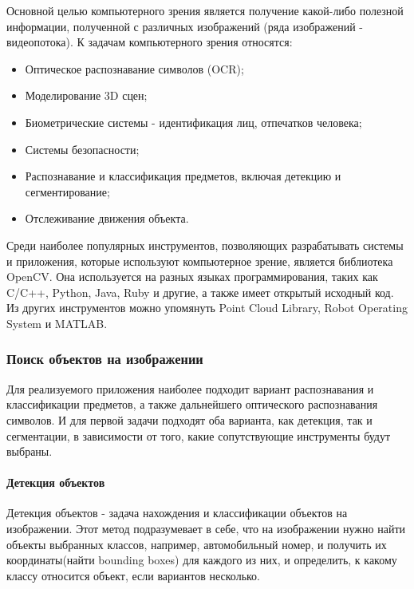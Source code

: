 \documentclass[a4paper,12pt]{article}
\begin{document}
Основной целью компьютерного зрения является получение какой-либо полезной информации, полученной с различных изображений (ряда изображений - видеопотока).
К задачам компьютерного зрения относятся:
\begin{itemize}
    \item Оптическое распознавание символов (OCR);
    \item Моделирование 3D сцен;
    \item Биометрические системы - идентификация лиц, отпечатков человека;
    \item Системы безопасности;
    \item Распознавание и классификация предметов, включая детекцию и сегментирование;
    \item Отслеживание движения объекта. \cite{goryachkin}
\end{itemize} 

Среди наиболее популярных инструментов, позволяющих разрабатывать системы и приложения, которые используют компьютерное зрение, является библиотека OpenCV. Она используется на разных языках программирования, таких как C/C++, Python, Java, Ruby и другие, а также имеет открытый исходный код.
Из других инструментов можно упомянуть Point Cloud Library, Robot Operating System и MATLAB.

\subsubsection{Поиск объектов на изображении}

Для реализуемого приложения наиболее подходит вариант распознавания и классификации предметов, а также дальнейшего оптического распознавания символов. И для первой задачи подходят оба варианта, как детекция, так и сегментации, в зависимости от того, какие сопутствующие инструменты будут выбраны.

\paragraph{Детекция объектов} \par\textbf{}

Детекция объектов - задача нахождения и классификации объектов на изображении. Этот метод подразумевает в себе, что на изображении нужно найти объекты выбранных классов, например, автомобильный номер, и получить их координаты(найти bounding boxes) для каждого из них, и определить, к какому классу относится объект, если вариантов несколько.
\end{document}
